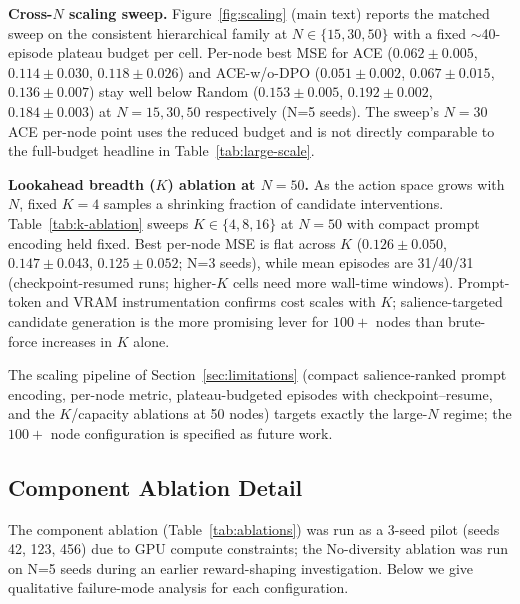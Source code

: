 \textbf{Cross-$N$ scaling sweep.} Figure~\ref{fig:scaling} (main text) reports the matched sweep on the consistent hierarchical family at $N\in\{15,30,50\}$ with a fixed $\sim$40-episode plateau budget per cell. Per-node best MSE for ACE ($0.062\pm0.005$, $0.114\pm0.030$, $0.118\pm0.026$) and ACE-w/o-DPO ($0.051\pm0.002$, $0.067\pm0.015$, $0.136\pm0.007$) stay well below Random ($0.153\pm0.005$, $0.192\pm0.002$, $0.184\pm0.003$) at $N{=}15,30,50$ respectively (N=5 seeds). The sweep's $N{=}30$ ACE per-node point uses the reduced budget and is not directly comparable to the full-budget headline in Table~\ref{tab:large-scale}.

\textbf{Lookahead breadth ($K$) ablation at $N{=}50$.} As the action space grows with $N$, fixed $K{=}4$ samples a shrinking fraction of candidate interventions. Table~\ref{tab:k-ablation} sweeps $K\in\{4,8,16\}$ at $N{=}50$ with compact prompt encoding held fixed. Best per-node MSE is flat across $K$ ($0.126\pm0.050$, $0.147\pm0.043$, $0.125\pm0.052$; N=3 seeds), while mean episodes are 31/40/31 (checkpoint-resumed runs; higher-$K$ cells need more wall-time windows). Prompt-token and VRAM instrumentation confirms cost scales with $K$; salience-targeted candidate generation is the more promising lever for $100+$ nodes than brute-force increases in $K$ alone.


The scaling pipeline of Section~\ref{sec:limitations} (compact salience-ranked prompt encoding, per-node metric, plateau-budgeted episodes with checkpoint--resume, and the $K$/capacity ablations at 50 nodes) targets exactly the large-$N$ regime; the $100+$ node configuration is specified as future work.

\subsection{Component Ablation Detail}
\label{app:ablation-detail}

The component ablation (Table~\ref{tab:ablations}) was run as a 3-seed pilot (seeds 42, 123, 456) due to GPU compute constraints; the No-diversity ablation was run on N=5 seeds during an earlier reward-shaping investigation. Below we give qualitative failure-mode analysis for each configuration.

